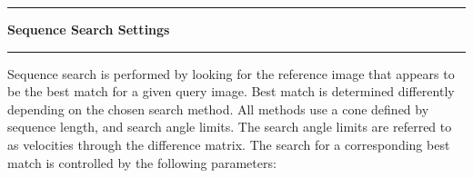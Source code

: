 \noindent\rule{\textwidth}{1pt}
\indent \textbf{Sequence Search Settings}
\noindent\rule{\textwidth}{1pt}
\smallskip
\parbox{\textwidth}{Sequence search is performed by looking for the reference image that appears to be the best match for a given query image. Best match is determined differently depending on the chosen search method. All methods use a cone defined by sequence length, and search angle limits. The search angle limits are referred to as velocities through the difference matrix. The search for a corresponding best match is controlled by the following parameters:}
